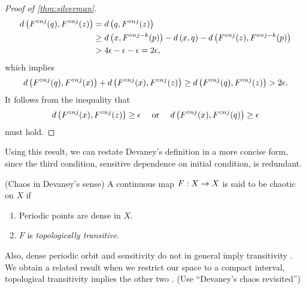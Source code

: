 \documentclass[12pt,draft,twoside]{book}
\begin{document}
\begin{proof}[Proof of \ref{thm:silverman}]
\begin{align*}
    d\left( F^{\circ nj}(q), F^{\circ nj}(z) \right) 
    &= d\left( q, F^{\circ nj}(z) \right)  \\
    &\geq  d\left( x, F^{\circ nj-k}(p) \right) - d\left( x,q \right) - d\left( F^{\circ nj}(z), F^{\circ nj - k}(p) \right)  \\
    &> 4\epsilon - \epsilon - \epsilon 
    = 2\epsilon,
  \end{align*}
  which implies
  \begin{equation*}
    d\left( F^{\circ nj}(q), F^{\circ nj}(x) \right) + d\left( F^{\circ nj}(x), F^{\circ nj}(z) \right) 
    \geq d\left( F^{\circ nj}(q), F^{\circ nj}(z) \right)
    > 2\epsilon.
  \end{equation*}
  It follows from the inequality that 
  \begin{equation*}
    d\left( F^{\circ nj}(x), F^{\circ nj}(z) \right) \geq \epsilon \quad\mbox{ or }\quad d\left( F^{\circ nj}(x), F^{\circ nj}(q) \right) \geq \epsilon 
  \end{equation*}
  must hold.
\end{proof}

Using this result, we can restate Devaney's definition in a more concise form, since the third condition, sensitive dependence on initial condition, is redundant.
\begin{definition}
  (Chaos in Devaney's sense) 
  A continuous map $F: X\rightarrow X$ is said to be chaotic on $X$ if
  \begin{enumerate}
    \item Periodic points are dense in $X$.
    \item $F$ is \textit{topologically transitive}.
  \end{enumerate}
\end{definition}
Also, dense periodic orbit and sensitivity do not in general imply transitivity \citep{assaf}.
We obtain a related result when we restrict our space to a compact interval, topological transitivity implies the other two \citep{silverman}.
(Use ``Devaney's chaos revisited'')
\end{document}
